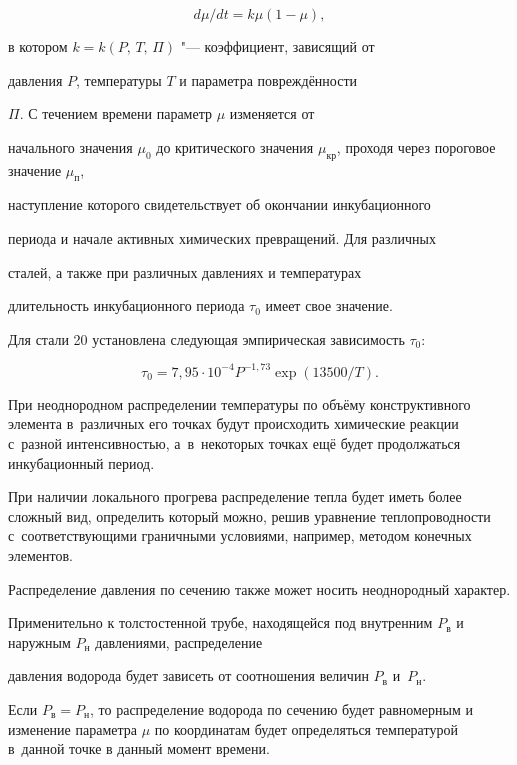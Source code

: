 \[

{d\mu }/{dt}=k \mu ( 1-\mu ),

\]

в котором $k=k(P,\,T,\,\varPi)$ "--- коэффициент, зависящий от

давления $P$, температуры $T$ и параметра повреждённости

$\varPi$. С течением времени параметр $\mu $ изменяется от

начального значения $\mu _0$ до критического значения $\mu

_\text{кр}$, проходя через пороговое значение $\mu_\text{п}$,

наступление которого свидетельствует об окончании инкубационного

периода и начале активных химических превращений. Для различных

сталей, а также при различных давлениях и температурах

длительность инкубационного периода $\tau _0$ имеет свое значение.

Для стали 20 установлена \cite{bubnov:bib2} следующая эмпирическая зависимость $\tau _0$:

\[

\tau _0 =7,95\cdot 10^{-4} P^{-1,73} \exp (13500/T) .

\]



При неоднородном распределении температуры по объёму конструктивного элемента в~различных его точках будут происходить химические реакции с~разной интенсивностью, а~в~некоторых точках ещё будет продолжаться инкубационный период. 

При наличии локального прогрева распределение тепла будет иметь более сложный вид, определить который можно, решив уравнение теплопроводности с~соответствующими граничными условиями, например, методом конечных элементов.



Распределение давления по сечению также может носить неоднородный характер. 

Применительно к толстостенной трубе, находящейся под внутренним $P_\text{в}$ и наружным $P_\text{н}$ давлениями, распределение

давления водорода будет зависеть от соотношения величин $P_\text{в}$ и~$P_\text{н}$. 

Если $P_\text{в} =P_\text{н}$, то распределение водорода по сечению будет равномерным и изменение параметра $\mu $ по координатам будет определяться температурой в~данной точке в данный момент времени.

